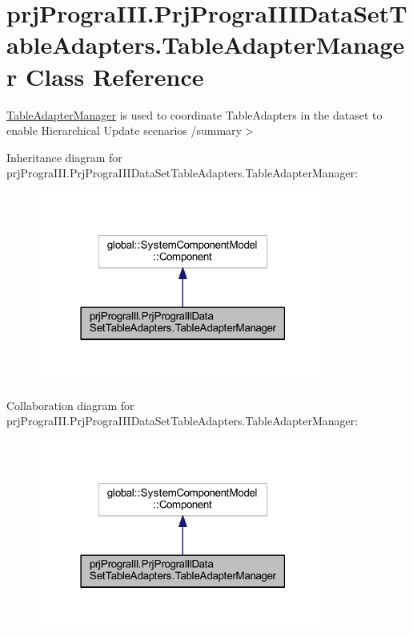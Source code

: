 \hypertarget{classprj_progra_i_i_i_1_1_prj_progra_i_i_i_data_set_table_adapters_1_1_table_adapter_manager}{}\section{prj\+Progra\+I\+I\+I.\+Prj\+Progra\+I\+I\+I\+Data\+Set\+Table\+Adapters.\+Table\+Adapter\+Manager Class Reference}
\label{classprj_progra_i_i_i_1_1_prj_progra_i_i_i_data_set_table_adapters_1_1_table_adapter_manager}


\hyperlink{classprj_progra_i_i_i_1_1_prj_progra_i_i_i_data_set_table_adapters_1_1_table_adapter_manager}{Table\+Adapter\+Manager} is used to coordinate Table\+Adapters in the dataset to enable Hierarchical Update scenarios /summary$>$  




Inheritance diagram for prj\+Progra\+I\+I\+I.\+Prj\+Progra\+I\+I\+I\+Data\+Set\+Table\+Adapters.\+Table\+Adapter\+Manager\+:
\nopagebreak
\begin{figure}[H]
\begin{center}
\leavevmode
\includegraphics[width=271pt]{classprj_progra_i_i_i_1_1_prj_progra_i_i_i_data_set_table_adapters_1_1_table_adapter_manager__inherit__graph}
\end{center}
\end{figure}


Collaboration diagram for prj\+Progra\+I\+I\+I.\+Prj\+Progra\+I\+I\+I\+Data\+Set\+Table\+Adapters.\+Table\+Adapter\+Manager\+:
\nopagebreak
\begin{figure}[H]
\begin{center}
\leavevmode
\includegraphics[width=271pt]{classprj_progra_i_i_i_1_1_prj_progra_i_i_i_data_set_table_adapters_1_1_table_adapter_manager__coll__graph}
\end{center}
\end{figure}
